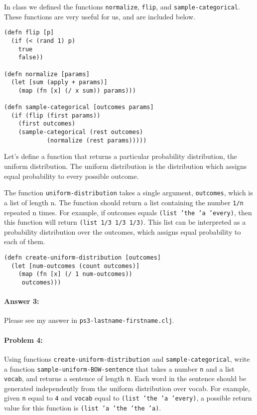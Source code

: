 \documentclass[10pt]{article}
\newcommand{\PSnum}{3}
\begin{document}
In class we defined the functions \texttt{normalize}, \texttt{flip},
and \texttt{sample-categorical}. These functions are very useful for
us, and are included below.

\begin{lstlisting}
(defn flip [p]
  (if (< (rand 1) p)
    true
    false))

(defn normalize [params]
  (let [sum (apply + params)]
    (map (fn [x] (/ x sum)) params)))

(defn sample-categorical [outcomes params]
  (if (flip (first params))
    (first outcomes)
    (sample-categorical (rest outcomes) 
			(normalize (rest params)))))
\end{lstlisting}

Let's define a function that returns a particular probability
distribution, the uniform distribution. The uniform distribution is
the distribution which assigns equal probability to every possible
outcome.
  
The function \texttt{uniform-distribution} takes a single argument,
\texttt{outcomes}, which is a list of length n. The function should
return a list containing the number \texttt{1/n} repeated n times. For
example, if outcomes equals \texttt{(list 'the 'a 'every)}, then this
function will return \texttt{(list 1/3 1/3 1/3)}. This list can be
interpreted as a probability distribution over the outcomes, which
assigns equal probability to each of them.

\begin{lstlisting}
(defn create-uniform-distribution [outcomes]
  (let [num-outcomes (count outcomes)]
    (map (fn [x] (/ 1 num-outcomes))
	 outcomes)))
\end{lstlisting}

\paragraph{Answer 3:} Please see my answer in \texttt{ps\PSnum-lastname-firstname.clj}.

\noindent\hrulefill %

\paragraph{Problem 4:}

Using functions \texttt{create-uniform-distribution} and
\texttt{sample-categorical}, write a function
\texttt{sample-uniform-BOW-sentence} that takes a number \texttt{n}
and a list \texttt{vocab}, and returns a sentence of length
\texttt{n}. Each word in the sentence should be generated
independently from the uniform distribution over vocab. For example,
given \texttt{n} equal to \texttt{4} and \texttt{vocab} equal to
\texttt{(list 'the 'a 'every)}, a possible return value for this
function is \texttt{(list 'a 'the 'the 'a)}.
\end{document}
